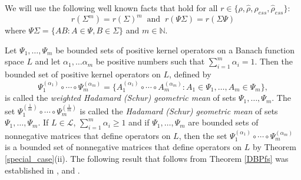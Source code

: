 \documentclass[12pt, reqno]{amsart}
\theoremstyle{definition}
\theoremstyle{remark}
\numberwithin{equation}{section}
\newcommand{\be}{\begin{equation}}
\newcommand{\ee}{\end{equation}}
\newcommand{\NN}{\mathbb{N}}
\begin{document}
We will  use the following well known facts that hold for all $r \in \{\rho,  \hat{\rho}, \rho _{ess}, \hat{\rho} _{ess}  \}$:
\be
r (\Sigma  ^m) = r (\Sigma)^m \;\;\mathrm{and}\;\;
r (\Psi \Sigma) = r (\Sigma\Psi)
\label{again}
\ee
where $\Psi \Sigma =\{AB: A\in \Psi, B\in \Sigma\}$ and $m\in \NN$.

Let $\Psi _1, \ldots , \Psi _m$ be bounded sets of positive kernel operators on a Banach function space $L$ and let $\alpha _1, \ldots \alpha _m$ be positive numbers such that
$\sum _{i=1} ^m \alpha _i = 1$. Then the bounded set of positive kernel operators on $L$, defined by
$$\Psi _1 ^{( \alpha _1)} \circ \cdots \circ \Psi _m ^{(\alpha _m)}=\{ A_1 ^{( \alpha _1)} \circ \cdots \circ A _m ^{(\alpha _m)}: A_1\in \Psi _1, \ldots, A_m \in \Psi _m \},$$
is called the {\it weighted Hadamard (Schur) geometric mean} of sets $\Psi _1, \ldots , \Psi _m$. The set
$\Psi _1 ^{(\frac{1}{m})} \circ \cdots \circ \Psi _m ^{(\frac{1}{m})}$ is called the  {\it Hadamard (Schur) geometric mean} of sets $\Psi _1, \ldots , \Psi _m$. If $L\in \mathcal{L}$, $\sum _{i=1} ^m \alpha _i \ge 1$ and if $\Psi _1, \ldots , \Psi _m$ are bounded sets of nonnegative matrices that define operators on $L$, %
then  the set $\Psi _1 ^{( \alpha _1)} \circ \cdots \circ \Psi _m ^{(\alpha _m)}$
is a bounded set of   nonnegative matrices that define operators on $L$ by Theorem \ref{special_case}(ii). 
The following result that follows from Theorem \ref{DBPfs} was established in \cite[Theorem 3.3]{P17}, \cite[Theorems 3.1 and 3.8]{P19} and \cite[Theorem 2.5]{BP22b}.

\end{document}
